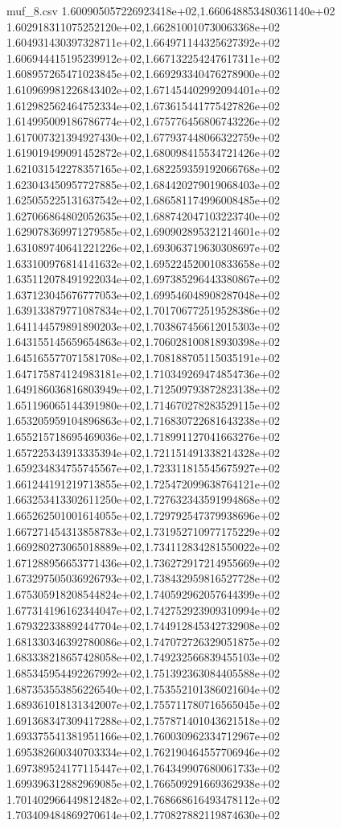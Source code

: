 \begin{filecontents*}{muf_8.csv}
1.600905057226923418e+02,1.660648853480361140e+02
1.602918311075252120e+02,1.662810010730063368e+02
1.604931430397328711e+02,1.664971144325627392e+02
1.606944415195239912e+02,1.667132254247617311e+02
1.608957265471023845e+02,1.669293340476278900e+02
1.610969981226843402e+02,1.671454402992094401e+02
1.612982562464752334e+02,1.673615441775427826e+02
1.614995009186786774e+02,1.675776456806743226e+02
1.617007321394927430e+02,1.677937448066322759e+02
1.619019499091452872e+02,1.680098415534721426e+02
1.621031542278357165e+02,1.682259359192066768e+02
1.623043450957727885e+02,1.684420279019068403e+02
1.625055225131637542e+02,1.686581174996008485e+02
1.627066864802052635e+02,1.688742047103223740e+02
1.629078369971279585e+02,1.690902895321214601e+02
1.631089740641221226e+02,1.693063719630308697e+02
1.633100976814141632e+02,1.695224520010833658e+02
1.635112078491922034e+02,1.697385296443380867e+02
1.637123045676777053e+02,1.699546048908287048e+02
1.639133879771087834e+02,1.701706772519528386e+02
1.641144579891890203e+02,1.703867456612015303e+02
1.643155145659654863e+02,1.706028100818930398e+02
1.645165577071581708e+02,1.708188705115035191e+02
1.647175874124983181e+02,1.710349269474854736e+02
1.649186036816803949e+02,1.712509793872823138e+02
1.651196065144391980e+02,1.714670278283529115e+02
1.653205959104896863e+02,1.716830722681643238e+02
1.655215718695469036e+02,1.718991127041663276e+02
1.657225343913335394e+02,1.721151491338214328e+02
1.659234834755745567e+02,1.723311815545675927e+02
1.661244191219713855e+02,1.725472099638764121e+02
1.663253413302611250e+02,1.727632343591994868e+02
1.665262501001614055e+02,1.729792547379938696e+02
1.667271454313858783e+02,1.731952710977175229e+02
1.669280273065018889e+02,1.734112834281550022e+02
1.671288956653771436e+02,1.736272917214955669e+02
1.673297505036926793e+02,1.738432959816527728e+02
1.675305918208544824e+02,1.740592962057644399e+02
1.677314196162344047e+02,1.742752923909310994e+02
1.679322338892447704e+02,1.744912845342732908e+02
1.681330346392780086e+02,1.747072726329051875e+02
1.683338218657428058e+02,1.749232566839455103e+02
1.685345954492267992e+02,1.751392363084405588e+02
1.687353553856226540e+02,1.753552101386021604e+02
1.689361018131342007e+02,1.755711780716565045e+02
1.691368347309417288e+02,1.757871401043621518e+02
1.693375541381951166e+02,1.760030962334712967e+02
1.695382600340703334e+02,1.762190464557706946e+02
1.697389524177115447e+02,1.764349907680061733e+02
1.699396312882969085e+02,1.766509291669362938e+02
1.701402966449812482e+02,1.768668616493478112e+02
1.703409484869270614e+02,1.770827882119874630e+02

\end{filecontents*}
